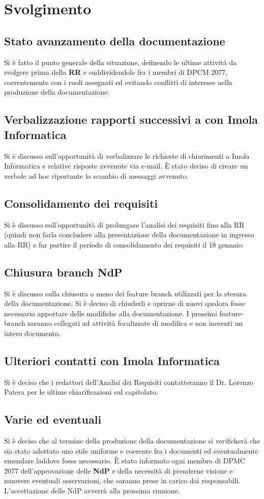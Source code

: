\section*{Svolgimento}
\subsection*{Stato avanzamento della documentazione}
Si è fatto il punto generale della situazione, definendo le ultime attività da svolgere prima della \textbf{RR} e suddividendole fra i membri di DPCM 2077, coerentemente con i ruoli assegnati ed evitando conflitti di interesse nella produzione della documentazione.
\subsection*{Verbalizzazione rapporti successivi a  con Imola Informatica}
Si è discusso sull'opportunità di verbalizzare le richieste di chiarimenti a Imola Informatica e relative risposte avvenute via e-mail. È stato deciso di creare un verbale ad hoc riportante lo scambio di messaggi avvenuto.
\subsection*{Consolidamento dei requisiti}
Si è discusso sull'opportunità di prolungare l'analisi dei requisiti fino alla RR (quindi non farla concludere alla presentazione della documentazione in ingresso alla RR) e far partire il periodo di consolidamento dei requisiti il 18 gennaio.
\subsection*{Chiusura branch NdP}
Si è discusso sulla chiusura o meno dei feature branch utilizzati per la stesura della documentazione. Si è deciso di chiuderli e aprirne di nuovi qualora fosse necessario apportare delle modifiche alla documentazione. I prossimi feature-branch saranno collegati ad attività focalizzate di modifica e non inerenti un intero documento.
\subsection*{Ulteriori contatti con Imola Informatica}
Si è deciso che i redattori dell’Analisi dei Requisiti contatteranno il Dr. Lorenzo Patera per le ultime chiarificazioni sul capitolato.
\subsection*{Varie ed eventuali}
Si è deciso che al termine della produzione della documentazione si verificherà che sia stato adottato uno stile uniforme e coerente fra i documenti ed eventualmente emendare laddove fosse necessario. È stato informato ogni membro di DPMC 2077 dell'approvazione delle \textbf{NdP} e della necessità di prenderne visione e muovere eventuali osservazioni, che saranno prese in carico dai responsabili. L'accettazione delle NdP avverrà alla prossima riunione. 
